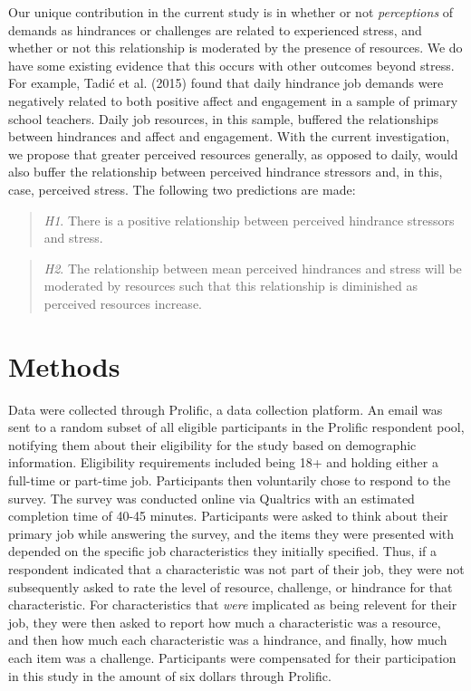 \documentclass[
  man]{apa6}
\begin{document}
Our unique contribution in the current study is in whether or not \emph{perceptions} of demands as hindrances or challenges are related to experienced stress, and whether or not this relationship is moderated by the presence of resources. We do have some existing evidence that this occurs with other outcomes beyond stress. For example, Tadić et al. (2015) found that daily hindrance job demands were negatively related to both positive affect and engagement in a sample of primary school teachers. Daily job resources, in this sample, buffered the relationships between hindrances and affect and engagement. With the current investigation, we propose that greater perceived resources generally, as opposed to daily, would also buffer the relationship between perceived hindrance stressors and, in this, case, perceived stress. The following two predictions are made:

\begin{quote}
\emph{H1}. There is a positive relationship between perceived hindrance stressors and stress.
\end{quote}

\begin{quote}
\emph{H2}. The relationship between mean perceived hindrances and stress will be moderated by resources such that this relationship is diminished as perceived resources increase.
\end{quote}

\hypertarget{methods}{%
\section{Methods}\label{methods}}

Data were collected through Prolific, a data collection platform. An email was sent to a random subset of all eligible participants in the Prolific respondent pool, notifying them about their eligibility for the study based on demographic information. Eligibility requirements included being 18+ and holding either a full-time or part-time job. Participants then voluntarily chose to respond to the survey. The survey was conducted online via Qualtrics with an estimated completion time of 40-45 minutes. Participants were asked to think about their primary job while answering the survey, and the items they were presented with depended on the specific job characteristics they initially specified. Thus, if a respondent indicated that a characteristic was not part of their job, they were not subsequently asked to rate the level of resource, challenge, or hindrance for that characteristic. For characteristics that \emph{were} implicated as being relevent for their job, they were then asked to report how much a characteristic was a resource, and then how much each characteristic was a hindrance, and finally, how much each item was a challenge. Participants were compensated for their participation in this study in the amount of six dollars through Prolific.
\end{document}
